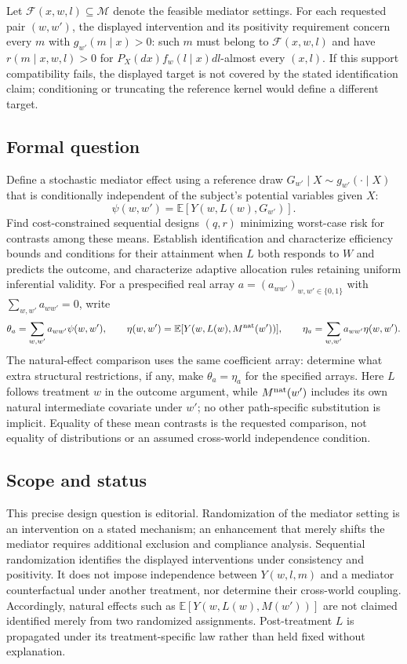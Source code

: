 \documentclass[11pt,a4paper]{article}
\newcommand{\E}{\mathbb E}
\begin{document}
Let $\mathcal F(x,w,l)\subseteq\mathcal M$ denote the feasible mediator settings. For each requested pair $(w,w')$, the displayed intervention and its positivity requirement concern every $m$ with $g_{w'}(m\mid x)>0$: such $m$ must belong to $\mathcal F(x,w,l)$ and have $r(m\mid x,w,l)>0$ for $P_X(dx)f_w(l\mid x)dl$-almost every $(x,l)$. If this support compatibility fails, the displayed target is not covered by the stated identification claim; conditioning or truncating the reference kernel would define a different target.
\subsection*{Formal question}
Define a stochastic mediator effect using a reference draw $G_{w'}\mid X\sim g_{w'}(\cdot\mid X)$ that is conditionally independent of the subject's potential variables given $X$:
\[
 \psi(w,w')=\E[Y(w,L(w),G_{w'})].
\]
Find cost-constrained sequential designs $(q,r)$ minimizing worst-case risk for contrasts among these means. Establish identification and characterize efficiency bounds and conditions for their attainment when $L$ both responds to $W$ and predicts the outcome, and characterize adaptive allocation rules retaining uniform inferential validity. For a prespecified real array $a=(a_{ww'})_{w,w'\in\{0,1\}}$ with $\sum_{w,w'}a_{ww'}=0$, write
\[
 \theta_a=\sum_{w,w'}a_{ww'}\psi(w,w'),\qquad
 \eta(w,w')=\E[Y(w,L(w),M^{\rm nat}(w'))],\qquad
 \eta_a=\sum_{w,w'}a_{ww'}\eta(w,w').
\]
The natural-effect comparison uses the same coefficient array: determine what extra structural restrictions, if any, make $\theta_a=\eta_a$ for the specified arrays. Here $L$ follows treatment $w$ in the outcome argument, while $M^{\rm nat}(w')$ includes its own natural intermediate covariate under $w'$; no other path-specific substitution is implicit. Equality of these mean contrasts is the requested comparison, not equality of distributions or an assumed cross-world independence condition.
\subsection*{Scope and status}
This precise design question is editorial. Randomization of the mediator setting is an intervention on a stated mechanism; an enhancement that merely shifts the mediator requires additional exclusion and compliance analysis. Sequential randomization identifies the displayed interventions under consistency and positivity. It does not impose independence between $Y(w,l,m)$ and a mediator counterfactual under another treatment, nor determine their cross-world coupling. Accordingly, natural effects such as $\E[Y(w,L(w),M(w'))]$ are not claimed identified merely from two randomized assignments. Post-treatment $L$ is propagated under its treatment-specific law rather than held fixed without explanation.
\end{document}
